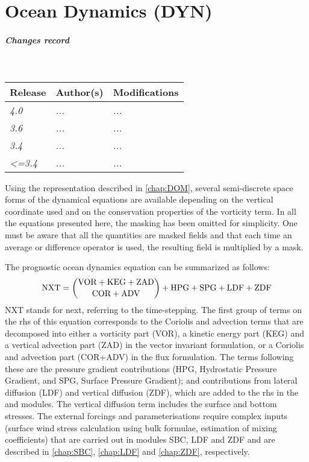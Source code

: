 \documentclass[../main/NEMO_manual]{subfiles}
\begin{document}
\chapter{Ocean Dynamics (DYN)}
\label{chap:DYN}

\thispagestyle{plain}

\chaptertoc

\paragraph{Changes record} ~\\

{\footnotesize
  \begin{tabularx}{\textwidth}{l||X|X}
    Release & Author(s) & Modifications \\
    \hline
    {\em   4.0} & {\em ...} & {\em ...} \\
    {\em   3.6} & {\em ...} & {\em ...} \\
    {\em   3.4} & {\em ...} & {\em ...} \\
    {\em <=3.4} & {\em ...} & {\em ...}
  \end{tabularx}
}

\clearpage

Using the representation described in \autoref{chap:DOM},
several semi-discrete space forms of the dynamical equations are available depending on
the vertical coordinate used and on the conservation properties of the vorticity term.
In all the equations presented here, the masking has been omitted for simplicity.
One must be aware that all the quantities are masked fields and
that each time an average or difference operator is used, the resulting field is multiplied by a mask.

The prognostic ocean dynamics equation can be summarized as follows:
\[
  \text{NXT} = \dbinom	{\text{VOR} + \text{KEG} + \text {ZAD} }
  {\text{COR} + \text{ADV}                       }
  + \text{HPG} + \text{SPG} + \text{LDF} + \text{ZDF}
\]
NXT stands for next, referring to the time-stepping.
The first group of terms on the rhs of this equation corresponds to the Coriolis and advection terms that
are decomposed into either a vorticity part (VOR), a kinetic energy part (KEG) and
a vertical advection part (ZAD) in the vector invariant formulation,
or a Coriolis and advection part (COR+ADV) in the flux formulation.
The terms following these are the pressure gradient contributions
(HPG, Hydrostatic Pressure Gradient, and SPG, Surface Pressure Gradient);
and contributions from lateral diffusion (LDF) and vertical diffusion (ZDF),
which are added to the rhs in the  and  modules.
The vertical diffusion term includes the surface and bottom stresses.
The external forcings and parameterisations require complex inputs
(surface wind stress calculation using bulk formulae, estimation of mixing coefficients)
that are carried out in modules SBC, LDF and ZDF and are described in
\autoref{chap:SBC}, \autoref{chap:LDF} and \autoref{chap:ZDF}, respectively.
\end{document}
